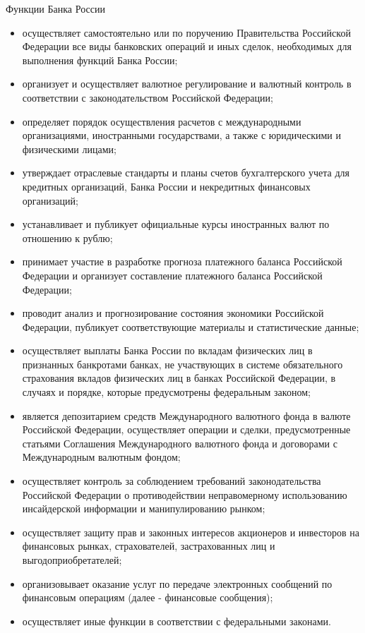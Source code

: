 \documentclass[_DKB_p1_Money.tex]{subfiles}
\begin{document}
\begin{frame}[ allowframebreaks]{Функции Банка России}
\begin{itemize}
\pagebreak
\item
осуществляет самостоятельно или по поручению Правительства Российской Федерации все виды банковских операций и иных сделок, необходимых для выполнения функций Банка России;
\item
организует и осуществляет валютное регулирование и валютный контроль в соответствии с законодательством Российской Федерации;

\pagebreak
\item
определяет порядок осуществления расчетов с международными организациями, иностранными государствами, а также с юридическими и физическими лицами;

\pagebreak
\item
утверждает отраслевые стандарты и планы счетов бухгалтерского учета для кредитных организаций, Банка России и некредитных финансовых организаций;
\item
устанавливает и публикует официальные курсы иностранных валют по отношению к рублю;

\pagebreak
\item
принимает участие в разработке прогноза платежного баланса Российской Федерации и организует составление платежного баланса Российской Федерации;

\pagebreak
\item
проводит анализ и прогнозирование состояния экономики Российской Федерации, публикует соответствующие материалы и статистические данные;
\item
осуществляет выплаты Банка России по вкладам физических лиц в признанных банкротами банках, не участвующих в системе обязательного страхования вкладов физических лиц в банках Российской Федерации, в случаях и порядке, которые предусмотрены федеральным законом;

\pagebreak
\item
является депозитарием средств Международного валютного фонда в валюте Российской Федерации, осуществляет операции и сделки, предусмотренные статьями Соглашения Международного валютного фонда и договорами с Международным валютным фондом;

\pagebreak
\item
осуществляет контроль за соблюдением требований законодательства Российской Федерации о противодействии неправомерному использованию инсайдерской информации и манипулированию рынком;

\pagebreak
\item
осуществляет защиту прав и законных интересов акционеров и инвесторов на финансовых рынках, страхователей, застрахованных лиц и выгодоприобретателей;

\pagebreak
\item
организовывает оказание услуг по передаче электронных сообщений по финансовым операциям (далее - финансовые сообщения);
\item
осуществляет иные функции в соответствии с федеральными законами.
\end{itemize}
\end{frame}
\end{document}
